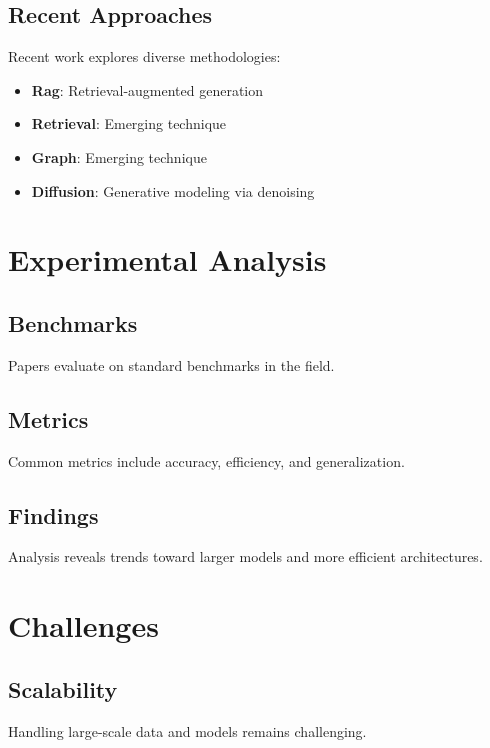 \documentclass[11pt,a4paper]{article}
\begin{document}
\subsection{Recent Approaches}

Recent work explores diverse methodologies:

\begin{itemize}
    \item \textbf{Rag}: Retrieval-augmented generation
    \item \textbf{Retrieval}: Emerging technique
    \item \textbf{Graph}: Emerging technique
    \item \textbf{Diffusion}: Generative modeling via denoising
\end{itemize}



\section{Experimental Analysis}

\subsection{Benchmarks}

Papers evaluate on standard benchmarks in the field.

\subsection{Metrics}

Common metrics include accuracy, efficiency, and generalization.

\subsection{Findings}

Analysis reveals trends toward larger models and more efficient architectures.



\section{Challenges}

\subsection{Scalability}

Handling large-scale data and models remains challenging.
\end{document}

